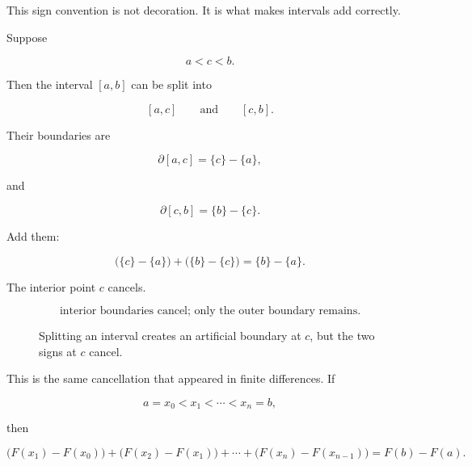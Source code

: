 This sign convention is not decoration.  It is what makes intervals add correctly.

Suppose

\[
a<c<b.
\]

Then the interval \([a,b]\) can be split into

\[
[a,c]
\qquad\text{and}\qquad
[c,b].
\]

Their boundaries are

\[
\partial[a,c]=\{c\}-\{a\},
\]

and

\[
\partial[c,b]=\{b\}-\{c\}.
\]

Add them:

\[
\bigl(\{c\}-\{a\}\bigr)+\bigl(\{b\}-\{c\}\bigr)=\{b\}-\{a\}.
\]

The interior point \(c\) cancels.

\[
\boxed{
\text{interior boundaries cancel; only the outer boundary remains.}
}
\]

\begin{figure}[h]
\centering
{}
\caption{Splitting an interval creates an artificial boundary at \(c\), but the two signs at \(c\) cancel.}
\label{fig:boundary-cancellation}
\end{figure}

This is the same cancellation that appeared in finite differences.  If

\[
a=x_0<x_1<\cdots<x_n=b,
\]

then

\[
\bigl(F(x_1)-F(x_0)\bigr)
+
\bigl(F(x_2)-F(x_1)\bigr)
+
\cdots
+
\bigl(F(x_n)-F(x_{n-1})\bigr)
=
F(b)-F(a).
\]

